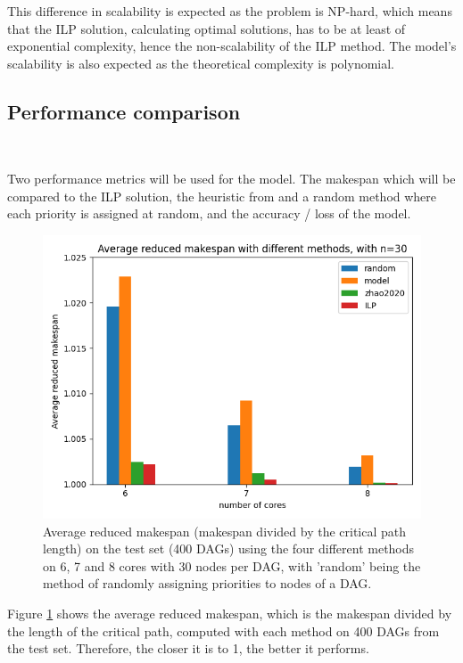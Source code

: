 This difference in scalability is expected as the problem is NP-hard,
which means that the ILP solution, calculating optimal solutions,
has to be at least of exponential complexity, hence the non-scalability of the ILP method.
The model's scalability is also expected as the theoretical complexity
is polynomial.


\subsection{Performance comparison}
~

Two performance metrics will be used for the model.
The makespan which will be compared to the ILP solution, the heuristic
from \citet{zhao2020DAGsched} and a random method where each priority is assigned at random,
and the accuracy / loss of the model.

\begin{figure}
    \centering
    \includegraphics[width=\linewidth]{images/avg_makespan_n30.png}
    \caption{Average reduced makespan (makespan divided by the critical path length) on the test set (400 DAGs) using the four different methods
    on 6, 7 and 8 cores with 30 nodes per DAG,
    with 'random' being the method of randomly assigning priorities to nodes of a DAG.}
    \label{fig:avg_makespan_comparison_trained}
\end{figure}

Figure \ref{fig:avg_makespan_comparison_trained} shows the average
reduced makespan, which is the makespan divided by the length of the critical path,
computed with each method on 400 DAGs from the test set.
Therefore, the closer it is to 1, the better it performs.

